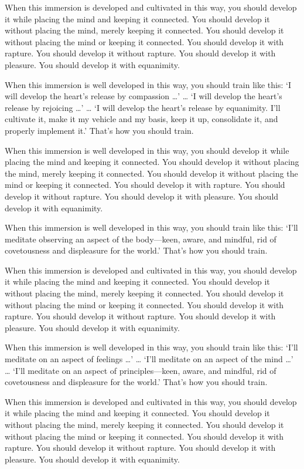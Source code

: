 \documentclass[12pt,openany]{book}%
\begin{document}
When this immersion is developed and cultivated in this way, you should develop it while placing the mind and keeping it connected. You should develop it without placing the mind, merely keeping it connected. You should develop it without placing the mind or keeping it connected. You should develop it with rapture. You should develop it without rapture. You should develop it with pleasure. You should develop it with equanimity. 

When this immersion is well developed in this way, you should train like this: ‘I will develop the heart’s release by compassion …’ … ‘I will develop the heart’s release by rejoicing …’ … ‘I will develop the heart’s release by equanimity. I’ll cultivate it, make it my vehicle and my basis, keep it up, consolidate it, and properly implement it.’ That’s how you should train. 

When this immersion is well developed in this way, you should develop it while placing the mind and keeping it connected. You should develop it without placing the mind, merely keeping it connected. You should develop it without placing the mind or keeping it connected. You should develop it with rapture. You should develop it without rapture. You should develop it with pleasure. You should develop it with equanimity. 

When this immersion is well developed in this way, you should train like this: ‘I’ll meditate observing an aspect of the body—keen, aware, and mindful, rid of covetousness and displeasure for the world.’ That’s how you should train. 

When this immersion is developed and cultivated in this way, you should develop it while placing the mind and keeping it connected. You should develop it without placing the mind, merely keeping it connected. You should develop it without placing the mind or keeping it connected. You should develop it with rapture. You should develop it without rapture. You should develop it with pleasure. You should develop it with equanimity. 

When this immersion is well developed in this way, you should train like this: ‘I’ll meditate on an aspect of feelings …’ … ‘I’ll meditate on an aspect of the mind …’ … ‘I’ll meditate on an aspect of principles—keen, aware, and mindful, rid of covetousness and displeasure for the world.’ That’s how you should train. 

When this immersion is developed and cultivated in this way, you should develop it while placing the mind and keeping it connected. You should develop it without placing the mind, merely keeping it connected. You should develop it without placing the mind or keeping it connected. You should develop it with rapture. You should develop it without rapture. You should develop it with pleasure. You should develop it with equanimity. 
\end{document}
